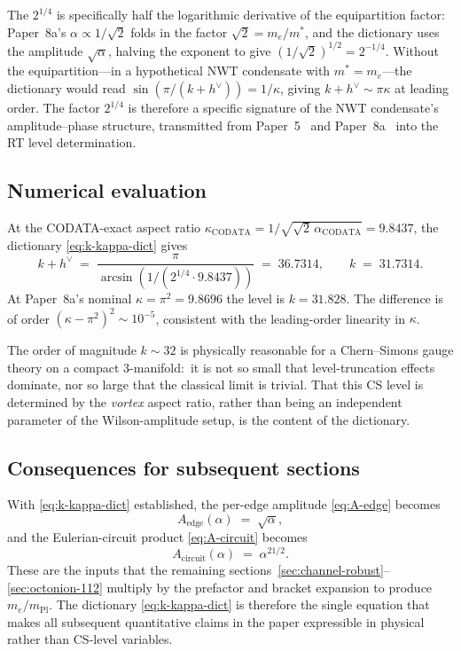 \documentclass[11pt]{article}
\newcommand{\mPl}{m_{\mathrm{Pl}}}
\newcommand{\hv}{h^{\vee}}
\begin{document}
\noindent
The $2^{1/4}$ is specifically half the logarithmic derivative of
the equipartition factor: Paper~8a's $\alpha \propto 1/\sqrt{2}$
folds in the factor $\sqrt{2} = m_e/m^*$, and the dictionary uses
the amplitude $\sqrt{\alpha}$, halving the exponent to give
$(1/\sqrt{2})^{1/2} = 2^{-1/4}$.  Without the equipartition---in
a hypothetical NWT condensate with
$m^* = m_e$---the dictionary would read
$\sin(\pi/(k + \hv)) = 1/\kappa$, giving $k + \hv \sim \pi \kappa$
at leading order.  The factor $2^{1/4}$ is therefore a specific
signature of the NWT condensate's amplitude--phase structure,
transmitted from Paper~5~\cite{paper5} and Paper~8a~\cite{paper8a}
into the RT level determination.

\subsection{Numerical evaluation}
\label{sec:k-alpha-numerical}

At the CODATA-exact aspect ratio
$\kappa_{\mathrm{CODATA}} = 1/\sqrt{\sqrt{2}\,\alpha_{\mathrm{CODATA}}} = 9.8437$,
the dictionary \eqref{eq:k-kappa-dict} gives
\begin{equation}
  k + \hv
  \;=\; \frac{\pi}{\arcsin(1/(2^{1/4}\cdot 9.8437))}
  \;=\; 36.7314,
  \qquad
  k \;=\; 31.7314.
  \label{eq:k-codata}
\end{equation}
At Paper~8a's nominal $\kappa = \pi^2 = 9.8696$ the level is
$k = 31.828$.  The difference is of order
$(\kappa - \pi^2)^2 \sim 10^{-5}$, consistent with the leading-order
linearity in $\kappa$.

The order of magnitude $k \sim 32$ is physically reasonable for a
Chern--Simons gauge theory on a compact 3-manifold:\ it is not so
small that level-truncation effects dominate, nor so large that
the classical limit is trivial.  That this CS level is determined
by the \emph{vortex} aspect ratio, rather than being an
independent parameter of the Wilson-amplitude setup, is the
content of the dictionary.

\subsection{Consequences for subsequent sections}
\label{sec:k-alpha-consequences}

With \eqref{eq:k-kappa-dict} established, the per-edge amplitude
\eqref{eq:A-edge} becomes
\begin{equation}
  A_{\mathrm{edge}}(\alpha) \;=\; \sqrt{\alpha},
\end{equation}
and the Eulerian-circuit product \eqref{eq:A-circuit} becomes
\begin{equation}
  A_{\mathrm{circuit}}(\alpha) \;=\; \alpha^{21/2}.
\end{equation}
These are the inputs that the remaining
sections~\ref{sec:channel-robust}--\ref{sec:octonion-112} multiply
by the prefactor and bracket expansion to produce $m_e/\mPl$.  The
dictionary \eqref{eq:k-kappa-dict} is therefore the single
equation that makes all subsequent quantitative claims in the
paper expressible in physical rather than CS-level variables.
\end{document}
